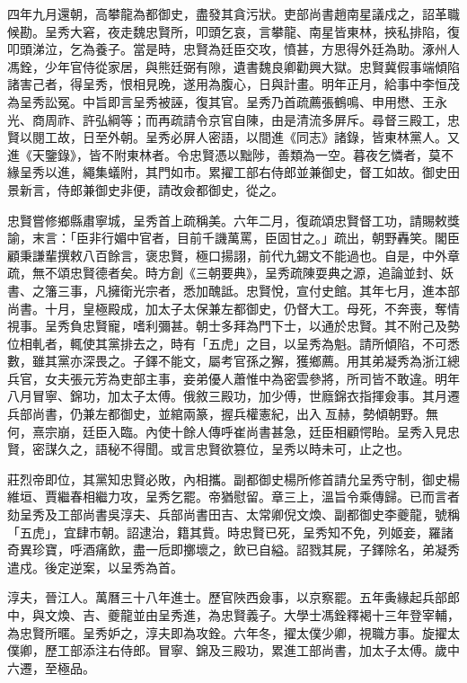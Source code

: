 \begin{pinyinscope}
四年九月還朝，高攀龍為都御史，盡發其貪污狀。吏部尚書趙南星議戍之，詔革職候勘。呈秀大窘，夜走魏忠賢所，叩頭乞哀，言攀龍、南星皆東林，挾私排陷，復叩頭涕泣，乞為養子。當是時，忠賢為廷臣交攻，憤甚，方思得外廷為助。涿州人馮銓，少年官侍從家居，與熊廷弼有隙，遺書魏良卿勸興大獄。忠賢冀假事端傾陷諸害己者，得呈秀，恨相見晚，遂用為腹心，日與計畫。明年正月，給事中李恒茂為呈秀訟冤。中旨即言呈秀被誣，復其官。呈秀乃首疏薦張鶴鳴、申用懋、王永光、商周祚、許弘綱等；而再疏請令京官自陳，由是清流多屏斥。尋督三殿工，忠賢以閱工故，日至外朝。呈秀必屏人密語，以間進《同志》諸錄，皆東林黨人。又進《天鑒錄》，皆不附東林者。令忠賢憑以黜陟，善類為一空。暮夜乞憐者，莫不緣呈秀以進，繩集蟻附，其門如市。累擢工部右侍郎並兼御史，督工如故。御史田景新言，侍郎兼御史非便，請改僉都御史，從之。

忠賢嘗修鄉縣肅寧城，呈秀首上疏稱美。六年二月，復疏頌忠賢督工功，請賜敕獎諭，末言：「臣非行媚中官者，目前千譏萬罵，臣固甘之。」疏出，朝野轟笑。閣臣顧秉謙輩撰敕八百餘言，褒忠賢，極口揚詡，前代九錫文不能過也。自是，中外章疏，無不頌忠賢德者矣。時方創《三朝要典》，呈秀疏陳耍典之源，追論並封、妖書、之籓三事，凡擁衛光宗者，悉加醜詆。忠賢悅，宣付史館。其年七月，進本部尚書。十月，皇極殿成，加太子太保兼左都御史，仍督大工。母死，不奔喪，奪情視事。呈秀負忠賢寵，嗜利彌甚。朝士多拜為門下士，以通於忠賢。其不附己及勢位相軋者，輒使其黨排去之，時有「五虎」之目，以呈秀為魁。請所傾陷，不可悉數，雖其黨亦深畏之。子鐸不能文，屬考官孫之獬，獲鄉薦。用其弟凝秀為浙江總兵官，女夫張元芳為吏部主事，妾弟優人蕭惟中為密雲參將，所司皆不敢違。明年八月冒寧、錦功，加太子太傅。俄敘三殿功，加少傅，世廕錦衣指揮僉事。其月遷兵部尚書，仍兼左都御史，並綰兩篆，握兵權憲紀，出入亙赫，勢傾朝野。無何，熹宗崩，廷臣入臨。內使十餘人傳呼崔尚書甚急，廷臣相顧愕眙。呈秀入見忠賢，密謀久之，語秘不得聞。或言忠賢欲篡位，呈秀以時未可，止之也。

莊烈帝即位，其黨知忠賢必敗，內相攜。副都御史楊所修首請允呈秀守制，御史楊維垣、賈繼春相繼力攻，呈秀乞罷。帝猶慰留。章三上，溫旨令乘傳歸。已而言者劾呈秀及工部尚書吳淳夫、兵部尚書田吉、太常卿倪文煥、副都御史李夔龍，號稱「五虎」，宜肆市朝。詔逮治，籍其貲。時忠賢已死，呈秀知不免，列姬妾，羅諸奇異珍寶，呼酒痛飲，盡一卮即擲壞之，飲已自縊。詔戮其屍，子鐸除名，弟凝秀遣戍。後定逆案，以呈秀為首。

淳夫，晉江人。萬曆三十八年進士。歷官陜西僉事，以京察罷。五年夤緣起兵部郎中，與文煥、吉、夔龍並由呈秀進，為忠賢義子。大學士馮銓釋褐十三年登宰輔，為忠賢所暱。呈秀妒之，淳夫即為攻銓。六年冬，擢太僕少卿，視職方事。旋擢太僕卿，歷工部添注右侍郎。冒寧、錦及三殿功，累進工部尚書，加太子太傅。歲中六遷，至極品。


\end{pinyinscope}
